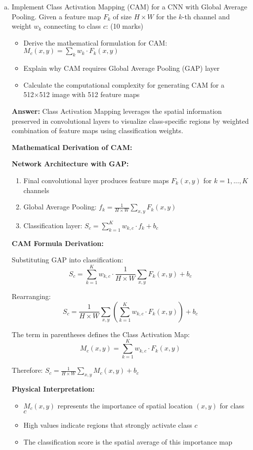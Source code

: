 \documentclass[12pt]{article}
\newcommand{\answer}[1]{{\color{answercolor}\textbf{Answer:} #1}}
\newcommand{\explanation}[1]{{\color{explanationcolor}#1}}
\begin{document}
\begin{enumerate}[(a)]
    \item Implement Class Activation Mapping (CAM) for a CNN with Global Average Pooling. Given a feature map $F_k$ of size $H \times W$ for the $k$-th channel and weight $w_k$ connecting to class $c$: \hfill (10 marks)
    \begin{itemize}
        \item Derive the mathematical formulation for CAM: $M_c(x,y) = \sum_k w_k \cdot F_k(x,y)$
        \item Explain why CAM requires Global Average Pooling (GAP) layer
        \item Calculate the computational complexity for generating CAM for a 512×512 image with 512 feature maps
    \end{itemize}
    
    \answer{Class Activation Mapping leverages the spatial information preserved in convolutional layers to visualize class-specific regions by weighted combination of feature maps using classification weights.}
    
    \explanation{
    \textbf{Mathematical Derivation of CAM:}
    
    \textbf{Network Architecture with GAP:}
    \begin{enumerate}
        \item Final convolutional layer produces feature maps $F_k(x,y)$ for $k = 1, ..., K$ channels
        \item Global Average Pooling: $f_k = \frac{1}{H \times W} \sum_{x,y} F_k(x,y)$
        \item Classification layer: $S_c = \sum_{k=1}^K w_{k,c} \cdot f_k + b_c$
    \end{enumerate}
    
    \textbf{CAM Formula Derivation:}
    
    Substituting GAP into classification:
    $$S_c = \sum_{k=1}^K w_{k,c} \cdot \frac{1}{H \times W} \sum_{x,y} F_k(x,y) + b_c$$
    
    Rearranging:
    $$S_c = \frac{1}{H \times W} \sum_{x,y} \left(\sum_{k=1}^K w_{k,c} \cdot F_k(x,y)\right) + b_c$$
    
    The term in parentheses defines the Class Activation Map:
    $$M_c(x,y) = \sum_{k=1}^K w_{k,c} \cdot F_k(x,y)$$
    
    Therefore: $S_c = \frac{1}{H \times W} \sum_{x,y} M_c(x,y) + b_c$
    
    \textbf{Physical Interpretation:}
    \begin{itemize}
        \item $M_c(x,y)$ represents the importance of spatial location $(x,y)$ for class $c$
        \item High values indicate regions that strongly activate class $c$
        \item The classification score is the spatial average of this importance map
    \end{itemize}
    
}
\end{enumerate}
\end{document}
